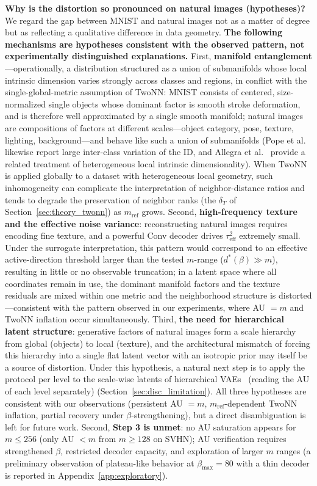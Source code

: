 \documentclass[make,article,submit,pdftex,moreauthors]{Definitions/mdpi}
\newcommand{\dstar}{d^{*}(\beta)}
\begin{document}
\textbf{Why is the distortion so pronounced on natural images
(hypotheses)?}
We regard the gap between MNIST and natural images not as a matter of
degree but as reflecting a qualitative difference in data geometry.
\textbf{The following mechanisms are hypotheses consistent with the
observed pattern, not experimentally distinguished explanations.}
First, \textbf{manifold entanglement}---operationally, a distribution
structured as a union of submanifolds whose local intrinsic dimension
varies strongly across classes and regions, in conflict with the
single-global-metric assumption of TwoNN: MNIST consists of centered,
size-normalized single objects whose dominant factor is smooth stroke
deformation, and is therefore well approximated by a single smooth
manifold; natural images are compositions of factors at different
scales---object category, pose, texture, lighting, background---and behave
like such a union of submanifolds (Pope et
al.~\cite{pope2021intrinsic} likewise report large inter-class variation
of the ID, and Allegra et al.~\cite{allegra2020data} provide a related
treatment of heterogeneous local intrinsic dimensionality).
When TwoNN is applied globally to a dataset with heterogeneous local
geometry, such inhomogeneity can complicate the interpretation of
neighbor-distance ratios and tends to degrade the preservation of neighbor
ranks (the
$\delta_T$ of Section~\ref{sec:theory_twonn}) as $m_{\mathrm{ref}}$
grows.
Second, \textbf{high-frequency texture and the effective noise variance}:
reconstructing natural images requires encoding fine texture, and a
powerful Conv decoder drives $\tau^2_{\mathrm{eff}}$ extremely small.
Under the surrogate interpretation, this pattern would correspond to an
effective active-direction threshold larger than the tested $m$-range
($\dstar \gg m$), resulting in little or no observable truncation; in a
latent space where
all coordinates remain in use, the dominant manifold factors and the
texture residuals are mixed within one metric and the neighborhood
structure is distorted---consistent with the pattern observed in our
experiments, where AU $= m$ and TwoNN inflation occur simultaneously.
Third, \textbf{the need for hierarchical latent structure}: generative
factors of natural images form a scale hierarchy from global (objects) to
local (texture), and the architectural mismatch of forcing this hierarchy
into a single flat latent vector with an isotropic prior may itself be a
source of distortion.
Under this hypothesis, a natural next step is to apply the protocol
per level to the scale-wise latents of hierarchical
VAEs~\cite{sonderby2016ladder} (reading the AU of each level separately)
(Section~\ref{sec:disc_limitation}).
All three hypotheses are consistent with our observations (persistent
AU $= m$, $m_{\mathrm{ref}}$-dependent TwoNN inflation, partial recovery
under $\beta$-strengthening), but a direct disambiguation is left for
future work.
Second, \textbf{Step 3 is unmet}: no AU saturation appears for
$m \leq 256$ (only AU $< m$ from $m \geq 128$ on SVHN); AU verification
requires strengthened $\beta$, restricted decoder capacity, and exploration
of larger $m$ ranges (a preliminary observation of plateau-like behavior at
$\beta_{\max} = 80$ with a thin decoder is reported in
Appendix~\ref{app:exploratory}).
\end{document}
